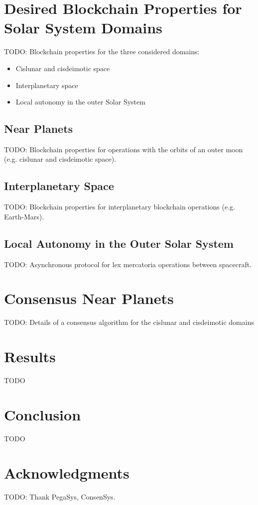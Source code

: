 \documentclass[]{aiaa-tc}%
\begin{document}
\section{Desired Blockchain Properties for Solar System Domains}

TODO: Blockchain properties for the three considered domains:
\begin{itemize}
\item Cislunar and cisdeimotic space
\item Interplanetary space
\item Local autonomy in the outer Solar System
\end{itemize}

\subsection{Near Planets}

TODO: Blockchain properties for operations with the orbits of an outer moon (e.g. cislunar and cisdeimotic space).


\subsection{Interplanetary Space}

TODO: Blockchain properties for interplanetary blockchain operations (e.g. Earth-Mars).


\subsection{Local Autonomy in the Outer Solar System}

TODO: Asynchronous protocol for lex mercatoria operations between spacecraft.


\section{Consensus Near Planets}

TODO: Details of a consensus algorithm for the cislunar  and cisdeimotic domains


\section{Results}

TODO


\section{Conclusion}

TODO


\section*{Acknowledgments}

TODO: Thank PegaSys, ConsenSys.




\end{document}
